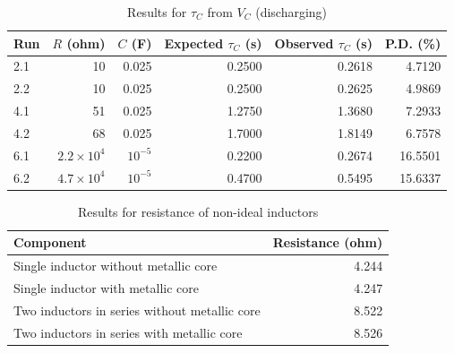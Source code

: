 \begin{table}[ht!]
    \begin{center}
        \begin{tabular}{|l|r|r|r|r|r|}
            \hline
            Run & $R$ (ohm) & $C$ (F) & Expected $\tau_{C}$ (s) & Observed $\tau_{C}$ (s) & P.D. (\%) \\
            \hline
            2.1 & 10 & 0.025 & 0.2500 & 0.2618 & 4.7120 \\
            2.2 & 10 & 0.025 & 0.2500 & 0.2625 & 4.9869 \\
            4.1 & 51 & 0.025 & 1.2750 & 1.3680 & 7.2933 \\
            4.2 & 68 & 0.025 & 1.7000 & 1.8149 & 6.7578 \\
            6.1 & $2.2 \times 10^{4}$ & $10^{-5}$ & 0.2200 & 0.2674 & 16.5501 \\
            6.2 & $4.7 \times 10^{4}$ & $10^{-5}$ & 0.4700 & 0.5495 & 15.6337 \\
            \hline
        \end{tabular}
    \end{center}
    \caption{Results for $\tau_{C}$ from $V_{C}$ (discharging)}
\end{table}
\begin{table}[ht!]
    \begin{center}
        \begin{tabular}{|l|r|}
            \hline
            Component & Resistance (ohm) \\
            \hline
            Single inductor without metallic core & 4.244 \\
            Single inductor with metallic core & 4.247 \\
            Two inductors in series without metallic core & 8.522 \\
            Two inductors in series with metallic core & 8.526 \\
            \hline
        \end{tabular}
    \end{center}
    \caption{Results for resistance of non-ideal inductors}
\end{table}
